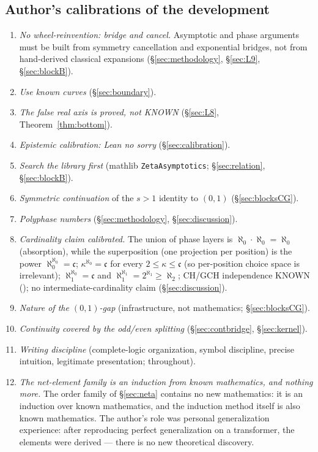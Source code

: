 \documentclass{article}
\begin{document}
\subsection*{Author's calibrations of the development}
\begin{enumerate}
\item \emph{No wheel-reinvention: bridge and cancel.} Asymptotic and phase
arguments must be built from symmetry cancellation and exponential bridges,
not from hand-derived classical expansions (\S\ref{sec:methodology},
\S\ref{sec:L9}, \S\ref{sec:blockB}).
\item \emph{Use known curves} (\S\ref{sec:boundary}).
\item \emph{The false real axis is proved, not KNOWN}
(\S\ref{sec:L8}, Theorem~\ref{thm:bottom}).
\item \emph{Epistemic calibration: Lean no sorry}
(\S\ref{sec:calibration}).
\item \emph{Search the library first} (mathlib \texttt{ZetaAsymptotics};
\S\ref{sec:relation}, \S\ref{sec:blockB}).
\item \emph{Symmetric continuation} of the $s>1$ identity to $(0,1)$
(\S\ref{sec:blocksCG}).
\item \emph{Polyphase numbers} (\S\ref{sec:methodology},
\S\ref{sec:discussion}).
\item \emph{Cardinality claim calibrated.} The union of phase layers is
$\aleph_0\cdot\aleph_0=\aleph_0$ (absorption), while the superposition
(one projection per position) is the power
$\aleph_0^{\aleph_0}=\mathfrak c$; $\kappa^{\aleph_0}=\mathfrak c$ for
every $2\le\kappa\le\mathfrak c$ (so per-position choice space is
irrelevant); $\aleph_1^{\aleph_0}=\mathfrak c$ and
$\aleph_1^{\aleph_1}=2^{\aleph_1}\ge\aleph_2$; CH/GCH independence KNOWN
(\cite{cohen}); no intermediate-cardinality claim
(\S\ref{sec:discussion}).
\item \emph{Nature of the $(0,1)$-gap} (infrastructure, not mathematics;
\S\ref{sec:blocksCG}).
\item \emph{Continuity covered by the odd/even splitting}
(\S\ref{sec:contbridge}, \S\ref{sec:kernel}).
\item \emph{Writing discipline} (complete-logic organization, symbol
discipline, precise intuition, legitimate presentation; throughout).
\item \emph{The net-element family is an induction from known
mathematics, and nothing more.} The order family of
\S\ref{sec:neta} contains no new mathematics: it is an induction over
known mathematics, and the induction method itself is also known
mathematics. The author's role was personal generalization experience:
after reproducing perfect generalization on a transformer, the
elements were derived --- there is no new theoretical discovery.
\end{enumerate}
\end{document}
